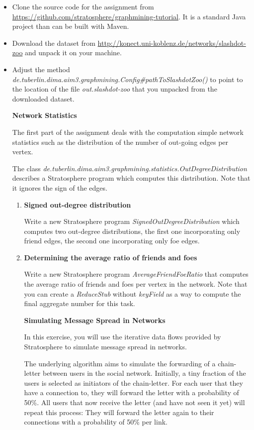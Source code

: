 \documentclass[11pt,a4paper]{article}
\begin{document}
\begin{itemize}
	\item Clone the source code for the assignment from \url{https://github.com/stratosphere/graphmining-tutorial}. It is a standard Java project than can be built with Maven.

	\item Download the dataset from \url{http://konect.uni-koblenz.de/networks/slashdot-zoo} and unpack it on your machine.

	\item Adjust the method \textit{de.tuberlin.dima.aim3.graphmining.Config\#pathToSlashdotZoo()} to point to the location of the file \textit{out.slashdot-zoo} that you unpacked from the downloaded dataset.

\bigskip
\bigskip
\bigskip
\centerline{\textbf{Network Statistics}}
\bigskip

The first part of the assignment deals with the computation simple network statistics such as the distribution of the number of out-going edges per vertex. 

The class \textit{de.tuberlin.dima.aim3.graphmining.statistics.OutDegreeDistribution} describes a Stratosphere program which computes this distribution. Note that it ignores the sign of the edges.

\begin{enumerate}

\item \textbf{Signed out-degree distribution}

Write a new Stratosphere program \textit{SignedOutDegreeDistribution} which computes two out-degree distributions, the first one incorporating only friend edges, the second one incorporating only foe edges.

\item \textbf{Determining the average ratio of friends and foes}

Write a new Stratosphere program \textit{AverageFriendFoeRatio} that computes the average ratio of friends and foes per vertex in the network. Note that you can create a \textit{ReduceStub} without \textit{keyField} as a way to compute the final aggregate number for this task.
 
\newpage
\centerline{\textbf{Simulating Message Spread in Networks}}

In this exercise, you will use the iterative data flows provided by Stratosphere to simulate message spread in networks. 

The underlying algorithm aims to simulate the forwarding of a chain-letter between users in the social network. Initially, a tiny fraction of the users is selected as initiators of the chain-letter. For each user that they have a connection to, they will forward the letter with a probability of 50\%. All users that now receive the letter (and have not seen it yet) will repeat this process: They will forward the letter again to their connections with a probability of 50\% per link.


\end{enumerate}
\end{itemize}
\end{document}
